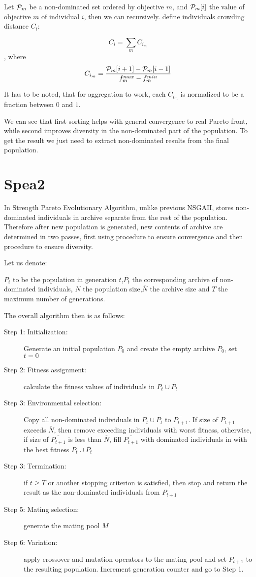\documentclass[12pt,oneside]{fithesis2}
\begin{document}
Let ${\cal P}_m$ be a non-dominated set ordered by objective $m$, and ${\cal P}_m[i]$ the value of objective $m$ of individual $i$, then we can recursively. define individuals crowding distance $C_i$:

$$C_i = \sum\limits_{m} C_{i_m} $$, where $$C_{i_m} = \frac{{\cal P}_m[i+1] - {\cal P}_m[i-1]}{f^{max}_m - f^{min}_m}$$

It has to be noted, that for aggregation to work, each $C_{i_m}$ is normalized to be a fraction between $0$ and $1$. 

We can see that first sorting helps with general convergence to real Pareto front, while second improves diversity in the non-dominated part of the population. To get the result we just need to extract non-dominated results from the final population. 

\section{Spea2}
In Strength Pareto Evolutionary Algorithm\cite{zitzler2001spea2}, unlike previous NSGAII, stores non-dominated individuals in archive separate from the rest of the population. Therefore after new population is generated, new contents of archive are determined in two passes, first using procedure to ensure convergence and then procedure to ensure diversity.

Let us denote:

$P_t$ to be the population in generation $t$,$\overline{P_t}$ the corresponding archive of non-dominated individuals, $N$ the population size,$\overline N$ the archive size and $T$ the maximum number of generations.

The overall algorithm then is as follows:

\begin{description}
	\item[Step 1: Initialization:] Generate an initial population $P_0$ and create the empty archive $\overline{P_0}$, set $t=0$
	\item[Step 2: Fitness assignment:] calculate the fitness values of individuals in $P_t \cup \overline{P_t}$
	\item[Step 3: Environmental selection:] Copy all non-dominated individuals in $P_t \cup \overline{P_t}$ to $\overline{P_{t+1}}$. If size of $\overline{P_{t+1}}$ exceeds $\overline N$, then remove exceeding individuals with worst fitness, otherwise, if size of $\overline{P_{t+1}}$ is less than $\overline N$, fill $\overline{P_{t+1}}$ with dominated individuals in  with the best fitness $P_t \cup \overline{P_t}$
	\item[Step 3: Termination:] if $t \geq T$ or another stopping criterion is satisfied, then stop and return the result as the non-dominated individuals from $\overline{P_{t+1}}$
	\item[Step 5: Mating selection:] generate the mating pool $M$
	\item[Step 6: Variation:] apply crossover and mutation operators to the mating pool and set $P_{t+1}$ to the resulting population. Increment generation counter and go to Step 1.
\end{description}
\end{document}
